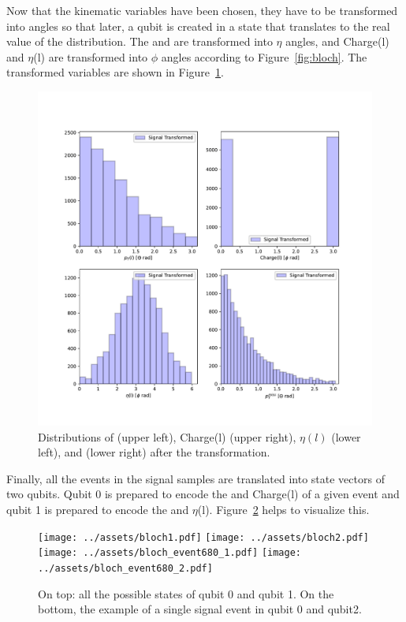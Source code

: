 Now that the kinematic variables have been chosen, they have to be transformed
into angles so that later, a qubit is created in a state that translates to the
real value of the distribution. The \ptl and \ptmiss are transformed into $\eta$
angles, and Charge(l) and $\eta$(l) are transformed into $\phi$ angles according
to Figure~\ref{fig:bloch}. The transformed variables are shown in 
Figure~\ref{fig:features_transformed}.

\begin{figure}[!htbp]
\centering
    \includegraphics[width=1\textwidth]{figures/features_transformed.pdf}
\caption{Distributions of \ptl (upper left), Charge(l) (upper right), $\eta(l)$ 
    (lower left), and \ptmiss (lower right) after the transformation.}
\label{fig:features_transformed}
\end{figure}

Finally, all the events in the signal samples are translated into state vectors
of two qubits. Qubit 0 is prepared to encode the \ptl and Charge(l) of a given
event and qubit 1 is prepared to encode the \ptmiss and $\eta$(l). 
Figure~\ref{fig:features_qubits} helps to visualize this.

\begin{figure}[!htbp]
\centering
    \texttt{[image: ../assets/bloch1.pdf]}
    \texttt{[image: ../assets/bloch2.pdf]} \\
    \texttt{[image: ../assets/bloch\_event680\_1.pdf]}
    \texttt{[image: ../assets/bloch\_event680\_2.pdf]} \\
\caption{On top: all the possible states of qubit 0 and qubit 1. On the bottom,
the example of a single signal event in qubit 0 and qubit2.}
\label{fig:features_qubits}
\end{figure}

